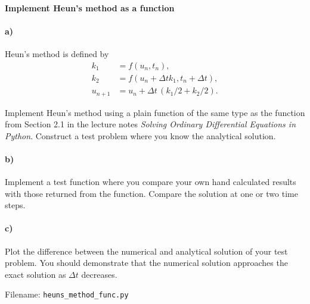 \begin{Problem}{\textbf{Implement Heun's method as a function}}\label{heuns_method_func}
\paragraph{a)}
\noindent
Heun's method is defined by
\begin{align*}
k_1 & = f(u_n, t_n), \\
k_2 & = f(u_n+\Delta t k_1, t_n+\Delta t), \\
u_{n+1} &= u_n + \Delta t\, (k_1/2 + k_2/2).
\end{align*}

Implement Heun's method using a plain function 
of the same type as the  function from Section 2.1
in the lecture notes \emph{Solving Ordinary Differential Equations in Python}.
Construct a test problem where you know the analytical solution.

\paragraph{b)}
Implement a test function 
where you compare your own hand calculated results with those returned from the
function. Compare the solution at one or two time steps.

\paragraph{c)}
Plot the difference between the numerical and analytical solution of your test
problem. You should demonstrate that the numerical solution approaches
the exact solution as $\Delta t$ decreases.

Filename: \texttt{heuns\_method\_func.py}
\end{Problem}


